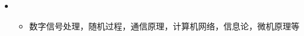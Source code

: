   \begin{itemize}[leftmargin=*]
    \item
      {\small
      \begin{itemize}
        \item{数字信号处理，随机过程，通信原理，计算机网络，信息论，微机原理等}
      \end{itemize}
      }
  \end{itemize}